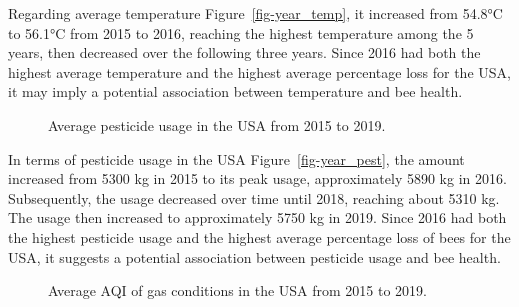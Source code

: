 \documentclass[
  letterpaper,
  DIV=11,
  numbers=noendperiod]{scrartcl}
\begin{document}
Regarding average temperature Figure~\ref{fig-year_temp}, it increased
from 54.8°C to 56.1°C from 2015 to 2016, reaching the highest
temperature among the 5 years, then decreased over the following three
years. Since 2016 had both the highest average temperature and the
highest average percentage loss for the USA, it may imply a potential
association between temperature and bee health.

\begin{figure}


\caption{\label{fig-year\_pest}Average pesticide usage in the USA from
2015 to 2019.}

\end{figure}%

In terms of pesticide usage in the USA Figure~\ref{fig-year_pest}, the
amount increased from 5300 kg in 2015 to its peak usage, approximately
5890 kg in 2016. Subsequently, the usage decreased over time until 2018,
reaching about 5310 kg. The usage then increased to approximately 5750
kg in 2019. Since 2016 had both the highest pesticide usage and the
highest average percentage loss of bees for the USA, it suggests a
potential association between pesticide usage and bee health.

\begin{figure}


\caption{\label{fig-year\_aqi}Average AQI of gas conditions in the USA
from 2015 to 2019.}

\end{figure}%
\end{document}
